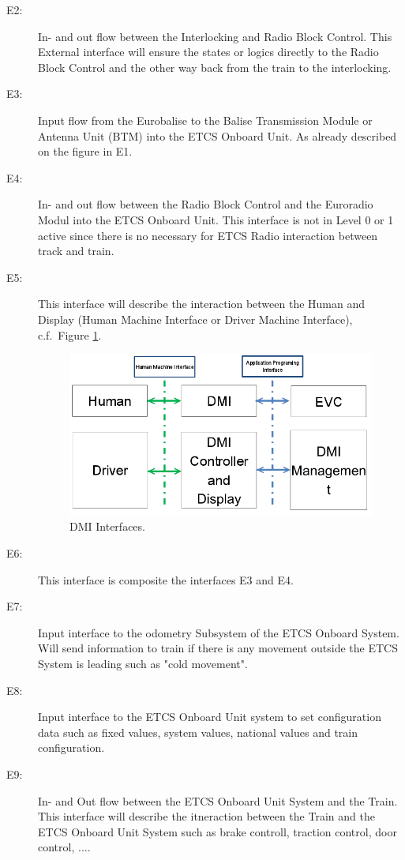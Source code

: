 \begin{description}
\item[E2:] In- and out flow between the Interlocking and Radio Block Control.
This External interface will ensure the states or logics directly to the Radio Block Control and the other way back from the train to the interlocking.

\item[E3:] Input flow from the Eurobalise to the Balise Transmission Module or Antenna Unit (BTM) into the ETCS Onboard Unit. As already described on the figure in E1.

\item[E4:] In- and out flow between the Radio Block Control and the Euroradio Modul into the ETCS Onboard Unit. This interface is not in Level 0 or 1 active since there is no necessary for ETCS Radio interaction between track and train.

\item[E5:] This interface will describe the interaction between the Human and Display (Human Machine Interface or Driver Machine Interface), c.f.~Figure \ref{DMI Interfaces}.
\begin{figure}
\centering
\includegraphics[scale=0.6]{images/DMIinterfaces}
\caption{DMI Interfaces.}
\label{DMI Interfaces}
\end{figure}

\item[E6:] This interface is composite the interfaces E3 and E4.

\item[E7:] Input interface to the odometry Subsystem of the ETCS Onboard System. Will send information to train if there is any movement outside the ETCS System is leading such as "cold movement".

\item[E8:] Input interface to the ETCS Onboard Unit system to set configuration data such as fixed values, system values, national values and train configuration.

\item[E9:] In- and Out flow between the ETCS Onboard Unit System and the Train. This interface will describe the itneraction between the Train and the ETCS Onboard Unit System such as brake controll, traction control, door control, ....
\end{description}


